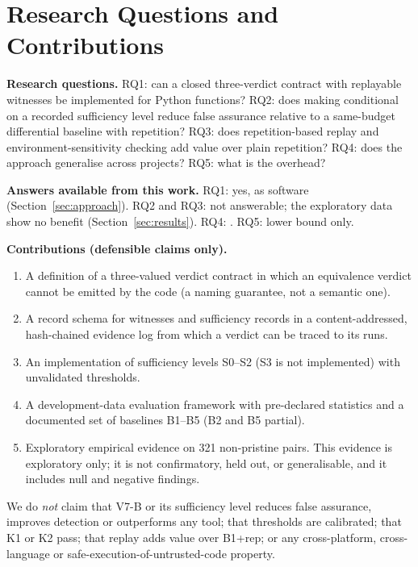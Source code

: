 \section{Research Questions and Contributions}\label{sec:rqs}
\textbf{Research questions.}
RQ1: can a closed three-verdict contract with replayable witnesses be implemented for Python functions? RQ2: does making \NDO{} conditional on a recorded sufficiency level reduce false assurance relative to a same-budget differential baseline with repetition? RQ3: does repetition-based replay and environment-sensitivity checking add value over plain repetition? RQ4: does the approach generalise across projects? RQ5: what is the overhead?

\textbf{Answers available from this work.} RQ1: yes, as software (Section~\ref{sec:approach}). RQ2 and RQ3: not answerable; the exploratory data show no benefit (Section~\ref{sec:results}). RQ4: \NE{}. RQ5: lower bound only.

\textbf{Contributions (defensible claims only).}
\begin{enumerate}
\item A definition of a three-valued verdict contract in which an equivalence verdict cannot be emitted by the code (a naming guarantee, not a semantic one).
\item A record schema for witnesses and sufficiency records in a content-addressed, hash-chained evidence log from which a verdict can be traced to its runs.
\item An implementation of sufficiency levels S0--S2 (S3 is not implemented) with unvalidated thresholds.
\item A development-data evaluation framework with pre-declared statistics and a documented set of baselines B1--B5 (B2 and B5 partial).
\item Exploratory empirical evidence on 321 non-pristine pairs. This evidence is exploratory only; it is not confirmatory, held out, or generalisable, and it includes null and negative findings.
\end{enumerate}
We do \emph{not} claim that V7-B or its sufficiency level reduces false assurance, improves detection or outperforms any tool; that thresholds are calibrated; that K1 or K2 pass; that replay adds value over B1+rep; or any cross-platform, cross-language or safe-execution-of-untrusted-code property.
